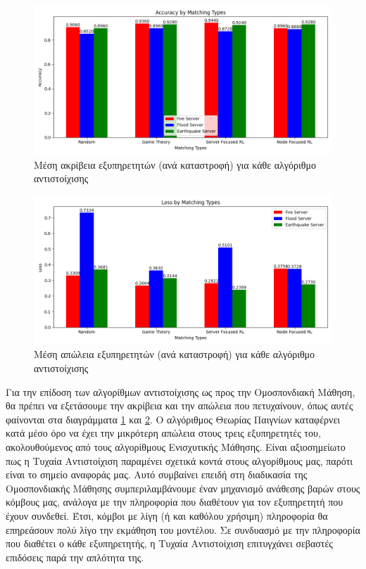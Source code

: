 \newpage

\begin{figure}[H]
    \centering
    \includegraphics[width=\textwidth]{figures/chapter3/accuracy_plot.png}
    \caption{Μέση ακρίβεια εξυπηρετητών (ανά καταστροφή) για κάθε αλγόριθμο αντιστοίχισης}
    \label{fig50}
\end{figure}

\begin{figure}[H]
    \centering
    \includegraphics[width=\textwidth]{figures/chapter3/loss_plot.png}
    \caption{Μέση απώλεια εξυπηρετητών (ανά καταστροφή) για κάθε αλγόριθμο αντιστοίχισης}
    \label{fig51}
\end{figure}

\newpage

Για την επίδοση των αλγορίθμων αντιστοίχισης ως προς την Ομοσπονδιακή Μάθηση, θα πρέπει να εξετάσουμε την ακρίβεια και την απώλεια που πετυχαίνουν, όπως αυτές φαίνονται στα διαγράμματα \ref*{fig50} και \ref*{fig51}. Ο αλγόριθμος Θεωρίας Παιγνίων καταφέρνει κατά μέσο όρο να έχει την μικρότερη απώλεια στους τρεις εξυπηρετητές του, ακολουθούμενος από τους αλγορίθμους Ενισχυτικής Μάθησης. Είναι αξιοσημείωτο πως η Τυχαία Αντιστοίχιση παραμένει σχετικά κοντά στους αλγορίθμους μας, παρότι είναι το σημείο αναφοράς μας. Αυτό συμβαίνει επειδή στη διαδικασία της Ομοσπονδιακής Μάθησης συμπεριλαμβάνουμε έναν μηχανισμό ανάθεσης βαρών στους κόμβους μας, ανάλογα με την πληροφορία που διαθέτουν για τον εξυπηρετητή που έχουν συνδεθεί. Έτσι, κόμβοι με λίγη (ή και καθόλου χρήσιμη) πληροφορία θα επηρεάσουν πολύ λίγο την εκμάθηση του μοντέλου. Σε συνδυασμό με την πληροφορία που διαθέτει ο κάθε εξυπηρετητής, η Τυχαία Αντιστοίχιση επιτυγχάνει σεβαστές επιδόσεις παρά την απλότητα της. 